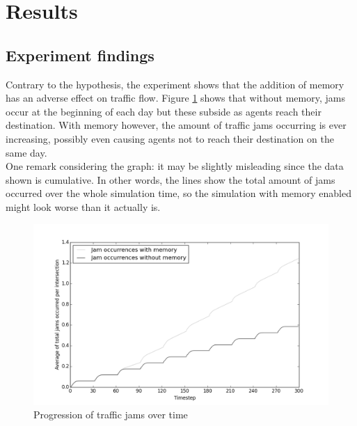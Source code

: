 \documentclass[a4paper,hidelinks]{article}
\begin{document}
%


\section{Results}
\subsection{Experiment findings}
Contrary to the hypothesis, the experiment shows that the addition of memory has an adverse effect on traffic flow. Figure \ref{fig:jam-progression} shows that without memory, jams occur at the beginning of each day but these subside as agents reach their destination. With memory however, the amount of traffic jams occurring is ever increasing, possibly even causing agents not to reach their destination on the same day. \\
One remark considering the graph: it may be slightly misleading since the data shown is cumulative. In other words, the lines show the total amount of jams occurred over the whole simulation time, so the simulation with memory enabled might look worse than it actually is.

\begin{figure}[ht!]
\centering
\includegraphics[width = 0.7\linewidth]{100sims-mem-vs-nomem}
\caption{Progression of traffic jams over time \label{fig:jam-progression}}
\end{figure} 
\end{document}
